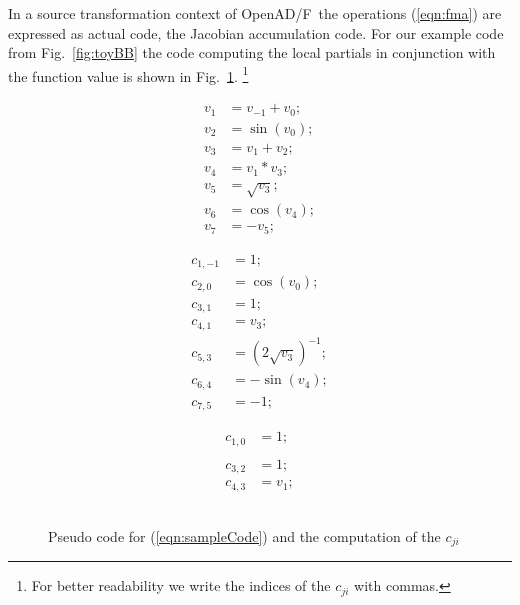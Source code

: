 \documentclass[11pt]{article}
\newcommand{\OpenADF}{OpenAD/F}
\newcommand{\reffig}[1]{{Fig.~\ref{#1}}}
\newcommand{\refeqn}[1]{{(\ref{#1})}}
\begin{document}
In a source transformation context of \OpenADF\ the operations \refeqn{eqn:fma} are 
expressed as actual code, the Jacobian accumulation code. For our example code 
from \reffig{fig:toyBB} the code computing 
the local partials in conjunction with the function value 
is shown in 
\reffig{fig:toyAndPartials}.
\footnote{
  For better readability we write the indices of the $c_{ji}$ with commas.
} 
\begin{figure}
  \begin{center}
    \begin{minipage}{.3\linewidth}
      \begin{align*}
        v_1&=v_{-1}+v_0; \\
        v_2&=\sin(v_0); \\
        v_3&=v_1+v_2; \\
        v_4&=v_1*v_3; \\
        v_5&=\sqrt{v_3};\\
        v_6&=\cos(v_4); \\
        v_7&=-v_5;
      \end{align*}
    \end{minipage}
    \begin{minipage}{.3\linewidth}
      \begin{align*}
        c_{1,-1}&=1; \\
        c_{2,0}&=\cos(v_0); \\
        c_{3,1}&=1; \\
        c_{4,1}&=v_3; \\
        c_{5,3}&=(2\sqrt{v_3})^{-1}; \\
        c_{6,4}&=-\sin(v_4); \\
        c_{7,5}&=-1;
      \end{align*}
    \end{minipage}
    \begin{minipage}{.2\linewidth}
      \begin{align*}
        c_{1,0}&=1; \\
        &\\
        c_{3,2}&=1; \\
        c_{4,3}&=v_1; \\
        &\\
        &\\
        &
      \end{align*}
    \end{minipage}
  \end{center}	
  \caption{Pseudo code for \refeqn{eqn:sampleCode} and the computation of the $c_{ji}$}\label{fig:toyAndPartials}
\end{figure}
\end{document}
